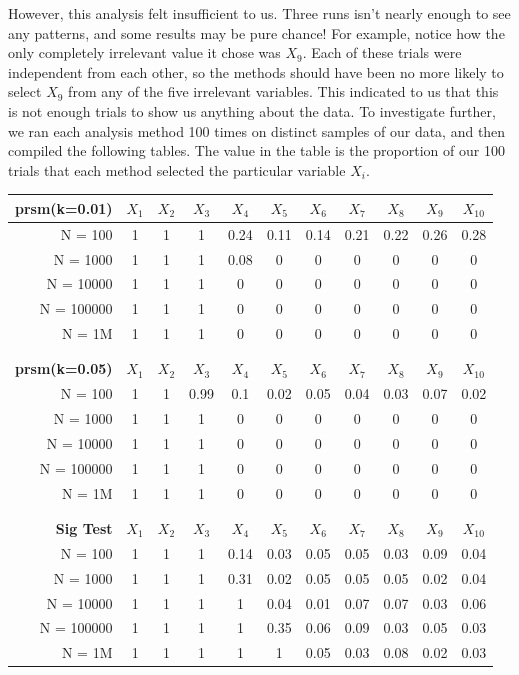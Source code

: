 \documentclass[letter]{article}
\begin{document}
However, this analysis felt insufficient to us. Three runs isn't nearly enough to see any patterns, and some results may be pure chance! For example, notice how the only completely irrelevant value it chose was $X_9$. Each of these trials were independent from each other, so the methods should have been no more likely to select $X_9$ from any of the five irrelevant variables. This indicated to us that this is not enough trials to show us anything about the data. To investigate further, we ran each analysis method 100 times on distinct samples of our data, and then compiled the following tables. The value in the table is the proportion of our 100 trials that each method selected the particular variable $X_i$.

\begin{tabular}{| r | c | c | c | c | c | c | c | c | c | c |}



\hline
\textbf{prsm(k=0.01)}&	$X_1$&	$X_2$&	$X_3$&	$X_4$&	$X_5$&	$X_6$&	$X_7$&	$X_8$&	$X_9$&	$X_{10}$\\
\hline
N = 100&			1&	1&	1&	0.24&	0.11&	0.14&	0.21&	0.22&	0.26&	0.28 	\\
N = 1000&			1&	1&	1&	0.08&	0&	0&	0&	0&	0&	0	\\
N = 10000&			1&	1&	1&	0&	0&	0&	0&	0&	0&	0	\\
N = 100000&		1&	1&	1&	0&	0&	0&	0&	0&	0&	0	\\
N = 1M&			1&	1&	1&	0&	0&	0&	0&	0&	0&	0	\\
\hline		

\\
								
									\\		
\hline					
\textbf{prsm(k=0.05)}&	$X_1$&	$X_2$&	$X_3$&	$X_4$&	$X_5$&	$X_6$&	$X_7$&	$X_8$&	$X_9$&	$X_{10}$\\
\hline
N = 100&			1&	1&	0.99&	0.1&	0.02&	0.05&	0.04&	0.03&	0.07&	0.02	\\
N = 1000&			1&	1&	1&	0&	0&	0&	0&	0&	0&	0	\\
N = 10000&			1&	1&	1&	0&	0&	0&	0&	0&	0&	0	\\
N = 100000&		1&	1&	1&	0&	0&	0&	0&	0&	0&	0	\\
N = 1M&			1&	1&	1&	0&	0&	0&	0&	0&	0&	0	\\
\hline
\\

								
											\\
\hline
\textbf{Sig Test}&	$X_1$&	$X_2$&	$X_3$&	$X_4$&	$X_5$&	$X_6$&	$X_7$&	$X_8$&	$X_9$&	$X_{10}$\\
\hline
N = 100&		1&	1&	1&	0.14&	0.03&	0.05&	0.05&	0.03&	0.09&	0.04	\\
N = 1000&		1&	1&	1&	0.31&	0.02&	0.05&	0.05&	0.05&	0.02&	0.04	\\
N = 10000&		1&	1&	1&	1&	0.04&	0.01&	0.07&	0.07&	0.03&	0.06	\\
N = 100000&	1&	1&	1&	1&	0.35&	0.06&	0.09&	0.03&	0.05&	0.03	\\
N = 1M&		1&	1&	1&	1&	1&	0.05&	0.03&	0.08&	0.02&	0.03	\\
\hline
\end{tabular}
\end{document}
